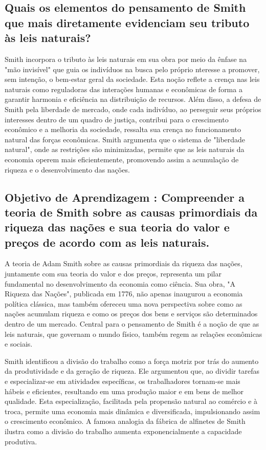 \documentclass[12pt]{article}
\begin{document}
\subsection{\textbf{Quais os elementos do pensamento de Smith que mais diretamente evidenciam seu tributo às leis naturais?}}
Smith incorpora o tributo às leis naturais em sua obra por meio da ênfase na "mão invisível" que guia os indivíduos na busca pelo próprio nteresse a promover, sem intenção, o bem-estar geral da sociedade. Esta noção reflete a crença nas leis naturais como reguladoras das interações humanas e econômicas de forma a garantir harmonia e eficiência na distribuição de recursos. Além disso, a defesa de Smith pela liberdade de mercado, onde cada indivíduo, ao perseguir seus próprios interesses dentro de um quadro de justiça, contribui para o crescimento econômico e a melhoria da sociedade, ressalta sua crença no funcionamento natural das forças econômicas. Smith argumenta que o sistema de "liberdade natural", onde as restrições são minimizadas, permite que as leis naturais da economia operem mais eficientemente, promovendo assim a acumulação de riqueza e o desenvolvimento das nações.
\subsection{\textbf{Objetivo de Aprendizagem : Compreender a teoria de Smith sobre as causas primordiais da riqueza das nações e sua teoria do valor e preços de acordo com as leis naturais.}}
A teoria de Adam Smith sobre as causas primordiais da riqueza das nações, juntamente com sua teoria do valor e dos preços, representa um pilar fundamental no desenvolvimento da economia como ciência. Sua obra, "A Riqueza das Nações", publicada em 1776, não apenas inaugurou a economia política clássica, mas também ofereceu uma nova perspectiva sobre como as nações acumulam riqueza e como os preços dos bens e serviços são determinados dentro de um mercado. Central para o pensamento de Smith é a noção de que as leis naturais, que governam o mundo físico, também regem as relações econômicas e sociais.

Smith identificou a divisão do trabalho como a força motriz por trás do aumento da produtividade e da geração de riqueza. Ele argumentou que, ao dividir tarefas e especializar-se em atividades específicas, os trabalhadores tornam-se mais hábeis e eficientes, resultando em uma produção maior e em bens de melhor qualidade. Esta especialização, facilitada pela propensão natural ao comércio e à troca, permite uma economia mais dinâmica e diversificada, impulsionando assim o crescimento econômico. A famosa analogia da fábrica de alfinetes de Smith ilustra como a divisão do trabalho aumenta exponencialmente a capacidade produtiva.
\end{document}
